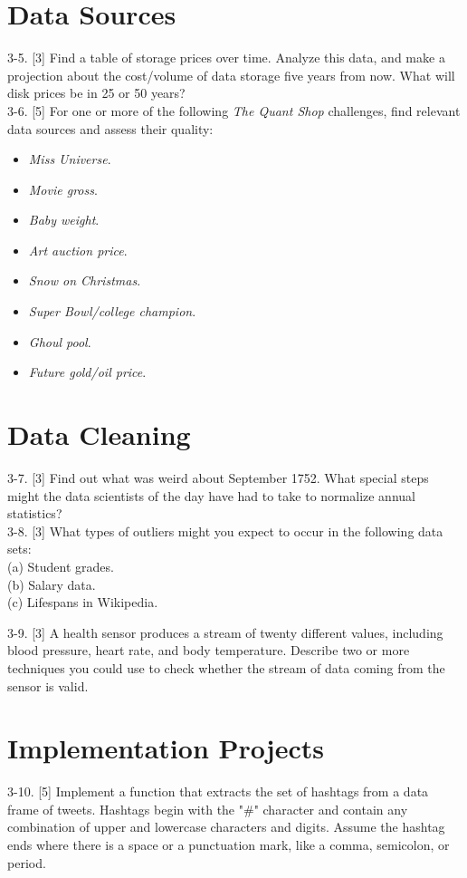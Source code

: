 \documentclass[10pt]{article}
\begin{document}
\section*{Data Sources}
3-5. [3] Find a table of storage prices over time. Analyze this data, and make a projection about the cost/volume of data storage five years from now. What will disk prices be in 25 or 50 years?\\
3-6. [5] For one or more of the following \textit{The Quant Shop} challenges, find relevant data sources and assess their quality:
\begin{itemize}
  \item \textit{Miss Universe}.
  \item \textit{Movie gross}.
  \item \textit{Baby weight}.
  \item \textit{Art auction price}.
  \item \textit{Snow on Christmas}.
  \item \textit{Super Bowl/college champion}.
  \item \textit{Ghoul pool}.
  \item \textit{Future gold/oil price}.
\end{itemize}

\section*{Data Cleaning}
3-7. [3] Find out what was weird about September 1752. What special steps might the data scientists of the day have had to take to normalize annual statistics?\\
3-8. [3] What types of outliers might you expect to occur in the following data sets:\\
(a) Student grades.\\
(b) Salary data.\\
(c) Lifespans in Wikipedia.

3-9. [3] A health sensor produces a stream of twenty different values, including blood pressure, heart rate, and body temperature. Describe two or more techniques you could use to check whether the stream of data coming from the sensor is valid.

\section*{Implementation Projects}
3-10. [5] Implement a function that extracts the set of hashtags from a data frame of tweets. Hashtags begin with the "\#" character and contain any combination of upper and lowercase characters and digits. Assume the hashtag ends where there is a space or a punctuation mark, like a comma, semicolon, or period.
\end{document}

